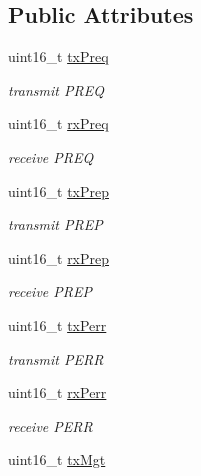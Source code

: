 \subsection*{Public Attributes}
\begin{DoxyCompactItemize}
\item 
uint16\+\_\+t \hyperlink{structns3_1_1dot11s_1_1HwmpProtocolMac_1_1Statistics_a3cdff022127738e992b5e7573ccd1a92}{tx\+Preq}
\begin{DoxyCompactList}\small\item\em transmit P\+R\+EQ \end{DoxyCompactList}\item 
uint16\+\_\+t \hyperlink{structns3_1_1dot11s_1_1HwmpProtocolMac_1_1Statistics_a81b97203fb82624f19ba87f73c242880}{rx\+Preq}
\begin{DoxyCompactList}\small\item\em receive P\+R\+EQ \end{DoxyCompactList}\item 
uint16\+\_\+t \hyperlink{structns3_1_1dot11s_1_1HwmpProtocolMac_1_1Statistics_a11437ec2314cccf28b5445bd4263580b}{tx\+Prep}
\begin{DoxyCompactList}\small\item\em transmit P\+R\+EP \end{DoxyCompactList}\item 
uint16\+\_\+t \hyperlink{structns3_1_1dot11s_1_1HwmpProtocolMac_1_1Statistics_a506d2ea8770378dcdee1619a12e3aeca}{rx\+Prep}
\begin{DoxyCompactList}\small\item\em receive P\+R\+EP \end{DoxyCompactList}\item 
uint16\+\_\+t \hyperlink{structns3_1_1dot11s_1_1HwmpProtocolMac_1_1Statistics_ae4c6f524d625756de6c93b57fa89dfcd}{tx\+Perr}
\begin{DoxyCompactList}\small\item\em transmit P\+E\+RR \end{DoxyCompactList}\item 
uint16\+\_\+t \hyperlink{structns3_1_1dot11s_1_1HwmpProtocolMac_1_1Statistics_a4c2d00bd9896bba23fa3dabcb40c5b7e}{rx\+Perr}
\begin{DoxyCompactList}\small\item\em receive P\+E\+RR \end{DoxyCompactList}\item 
uint16\+\_\+t \hyperlink{structns3_1_1dot11s_1_1HwmpProtocolMac_1_1Statistics_a78612a24d8373449a33e403bd30fab04}{tx\+Mgt}

\end{DoxyCompactItemize}
